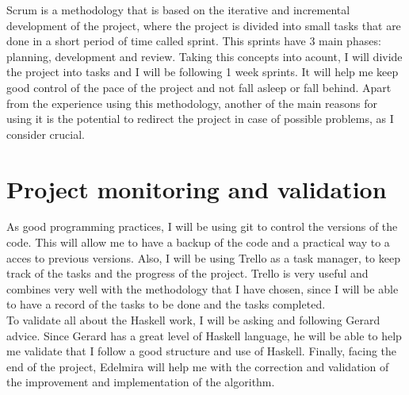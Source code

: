 Scrum is a methodology that is based on the iterative and incremental development of the project, where the project is divided into small tasks that are done in a short period of time called sprint.
This sprints have 3 main phases: planning, development and review.
Taking this concepts into acount, I will divide the project into tasks and I will be following 1 week sprints.
It will help me keep good control of the pace of the project and not fall asleep or fall behind.
Apart from the experience using this methodology, another of the main reasons for using it is the potential to redirect the project in case of possible problems, as I consider crucial.
\section{Project monitoring and validation}
As good programming practices, I will be using git \cite{noauthor_git_nodate} to control the versions of the code.
This will allow me to have a backup of the code and a practical way to a acces to previous versions.
Also, I will be using Trello as a task manager, to keep track of the tasks and the progress of the project.
Trello is very useful and combines very well with the methodology that I have chosen, since I will be able to have a record of the tasks to be done and the tasks completed. \\

To validate all about the Haskell work, I will be asking and following Gerard advice. 
Since Gerard has a great level of Haskell language, he will be able to help me validate that I follow a good structure and use of Haskell.
Finally, facing the end of the project, Edelmira will help me with the correction and validation of the improvement and implementation of the algorithm.






